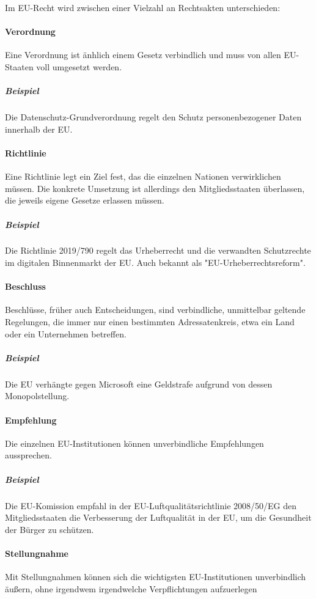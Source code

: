 \documentclass{article}
\begin{document}
	Im EU-Recht wird zwischen einer Vielzahl an Rechtsakten unterschieden:

	\paragraph{Verordnung}
	Eine Verordnung ist änhlich einem Gesetz verbindlich und muss von allen EU-Staaten voll umgesetzt werden.

	\subparagraph{Beispiel}
	Die Datenschutz-Grundverordnung regelt den Schutz personenbezogener Daten innerhalb der EU.

	\paragraph{Richtlinie}
	Eine Richtlinie legt ein Ziel fest, das die einzelnen Nationen verwirklichen müssen. Die konkrete Umsetzung ist allerdings den Mitgliedsstaaten überlassen, die jeweils eigene Gesetze erlassen müssen.

	\subparagraph{Beispiel}
	Die Richtlinie 2019/790 regelt das Urheberrecht und die verwandten Schutzrechte im digitalen Binnenmarkt der EU. Auch bekannt als "EU-Urheberrechtsreform".

	\paragraph{Beschluss}
	Beschlüsse, früher auch Entscheidungen, sind verbindliche, unmittelbar geltende Regelungen, die immer nur einen bestimmten Adressatenkreis, etwa ein Land oder ein Unternehmen betreffen.

	\subparagraph{Beispiel}
	Die EU verhängte gegen Microsoft eine Geldstrafe aufgrund von dessen Monopolstellung.

	\paragraph{Empfehlung}
	Die einzelnen EU-Institutionen können unverbindliche Empfehlungen aussprechen.

	\subparagraph{Beispiel}
	Die EU-Komission empfahl in der EU-Luftqualitätsrichtlinie 2008/50/EG  den Mitgliedsstaaten die Verbesserung der Luftqualität in der EU, um die Gesundheit der Bürger zu schützen.

	\paragraph{Stellungnahme}
	Mit Stellungnahmen können sich die wichtigsten EU-Institutionen unverbindlich äußern, ohne irgendwem irgendwelche Verpflichtungen aufzuerlegen
\end{document}
